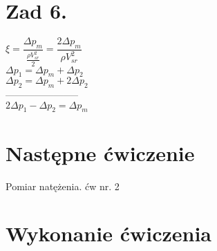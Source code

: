 \documentclass[a4paper,12pt]{article}
\begin{document}
\section{Zad 6.}
$\xi=\dfrac{\Delta p_m}{\frac{\rho V_{sr}^2}{2}}=\dfrac{2\Delta p_m}{\rho V_{sr}^2}$\\
$\Delta p_1=\Delta p_m+\Delta p_2$\\
$\Delta p_2=\Delta p_m+2\Delta p_2$\\
-----------------------\\
$2\Delta p_1-\Delta p_2 = \Delta p_m$\\
\section{Następne ćwiczenie}
Pomiar natężenia. ćw nr. 2
\section{Wykonanie ćwiczenia}
\end{document}
